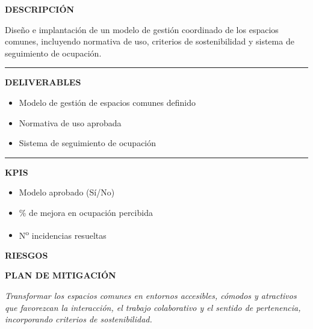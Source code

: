 \documentclass[11pt,a4paper]{scrreprt}
\newcommand{\fieldlabel}[1]{%
  {\footnotesize\sffamily\bfseries\color{mutedcolor}\MakeUppercase{#1}}\par\nopagebreak[4]
}
\newcommand{\fieldsep}{\vspace{3pt}\noindent\textcolor{bordercolor}{\rule{\linewidth}{0.4pt}}\vspace{3pt}\par}
\begin{document}
\begin{tcolorbox}[pabox={espcolor}{PA7.2 \enspace\textbullet\enspace Implantación de sistema de gestión y optimización de espacios comunes}]

\fieldlabel{Descripci\'on}
{\small Diseño e implantación de un modelo de gestión coordinado de los espacios comunes, incluyendo normativa de uso, criterios de sostenibilidad y sistema de seguimiento de ocupación.}\par
\fieldsep
\fieldlabel{Deliverables}
{\small \begin{itemize}[noitemsep,topsep=2pt]
\item Modelo de gestión de espacios comunes definido
\item Normativa de uso aprobada
\item Sistema de seguimiento de ocupación
\end{itemize}}\par
\fieldsep
\fieldlabel{KPIs}
{\small \begin{itemize}[noitemsep,topsep=2pt]
\item Modelo aprobado (Sí/No)
\item \% de mejora en ocupación percibida
\item N\textsuperscript{o} incidencias resueltas
\end{itemize}}\par
\end{tcolorbox}
\begin{tcolorbox}[riskbox]
{\footnotesize\sffamily\bfseries\color{red!50!black} RIESGOS}\par{}
\end{tcolorbox}
\begin{tcolorbox}[mitbox]
{\footnotesize\sffamily\bfseries\color{green!40!black} PLAN DE MITIGACI\'ON}\par{}
\end{tcolorbox}
\vspace{8pt}

\newpage
{}
{\small\color{mutedcolor}\itshape Transformar los espacios comunes en entornos accesibles, cómodos y atractivos que favorezcan la interacción, el trabajo colaborativo y el sentido de pertenencia, incorporando criterios de sostenibilidad.}\par\vspace{6pt}
\end{document}
